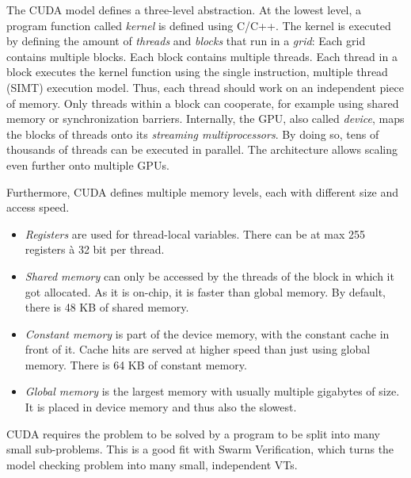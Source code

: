 \documentclass[
fancyheadings, %
%
%
]{stsreprt}
\begin{document}
The CUDA model defines a three-level abstraction.
At the lowest level, a program function called \emph{kernel} is defined using C/C++.
The kernel is executed by defining the amount of \emph{threads} and \emph{blocks} that run in a \emph{grid}:
Each grid contains multiple blocks.
Each block contains multiple threads.
Each thread in a block executes the kernel function using the single instruction, multiple thread (SIMT) execution model.
Thus, each thread should work on an independent piece of memory.
Only threads within a block can cooperate, for example using shared memory or synchronization barriers.
Internally, the GPU, also called \emph{device}, maps the blocks of threads onto its \emph{streaming multiprocessors}.
By doing so, tens of thousands of threads can be executed in parallel.
The architecture allows scaling even further onto multiple GPUs.

Furthermore, CUDA defines multiple memory levels, each with different size and access speed.

\begin{itemize}
    \item \emph{Registers} are used for thread-local variables.
          There can be at max 255 registers à 32 bit per thread.


    \item \emph{Shared memory} can only be accessed by the threads of the block in which it got allocated.
          As it is on-chip, it is faster than global memory.
          By default, there is 48 KB of shared memory.

    \item \emph{Constant memory} is part of the device memory, with the constant cache in front of it.
          Cache hits are served at higher speed than just using global memory.
          There is 64 KB of constant memory.


    \item \emph{Global memory} is the largest memory with usually multiple gigabytes of size.
          It is placed in device memory and thus also the slowest.
\end{itemize}

CUDA requires the problem to be solved by a program to be split into many small sub-problems.
This is a good fit with Swarm Verification, which turns the model checking problem into many small, independent VTs.
\end{document}
